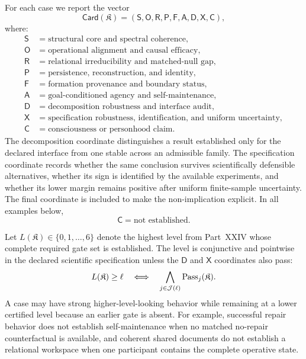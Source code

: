 
For each case we report the vector
\[
\boxed{
\mathsf{Card}(\mathfrak K)
=
\left(
\mathsf S,
\mathsf O,
\mathsf R,
\mathsf P,
\mathsf F,
\mathsf A,
\mathsf D,
\mathsf X,
\mathsf C
\right),
}
\]
where:
\[
\begin{array}{ll}
\mathsf S & = \text{structural core and spectral coherence},\\
\mathsf O & = \text{operational alignment and causal efficacy},\\
\mathsf R & = \text{relational irreducibility and matched-null gap},\\
\mathsf P & = \text{persistence, reconstruction, and identity},\\
\mathsf F & = \text{formation provenance and boundary status},\\
\mathsf A & = \text{goal-conditioned agency and self-maintenance},\\
\mathsf D & = \text{decomposition robustness and interface audit},\\
\mathsf X & = \text{specification robustness, identification, and uniform uncertainty},\\
\mathsf C & = \text{consciousness or personhood claim}.
\end{array}
\]
The decomposition coordinate distinguishes a result established only for the
declared interface from one stable across an admissible family. The
specification coordinate records whether the same conclusion survives
scientifically defensible alternatives, whether its sign is identified by the
available experiments, and whether its lower margin remains positive after
uniform finite-sample uncertainty. The final coordinate is included to make
the non-implication explicit. In all examples below,
\[
\mathsf C=\text{not established}.
\]


Let \(L(\mathfrak K)\in\{0,1,\ldots,6\}\) denote the highest level from
Part~XXIV whose complete required gate set is established. The level is
conjunctive and pointwise in the declared scientific specification unless the
\(\mathsf D\) and \(\mathsf X\) coordinates also pass:
\[
L(\mathfrak K)\geq \ell
\quad\Longleftrightarrow\quad
\bigwedge_{j\in\mathcal J(\ell)}\operatorname{Pass}_j(\mathfrak K).
\]
A case may have strong higher-level-looking behavior while remaining at a lower
certified level because an earlier gate is absent. For example, successful
repair behavior does not establish self-maintenance when no matched no-repair
counterfactual is available, and coherent shared documents do not establish a
relational workspace when one participant contains the complete operative
state.

